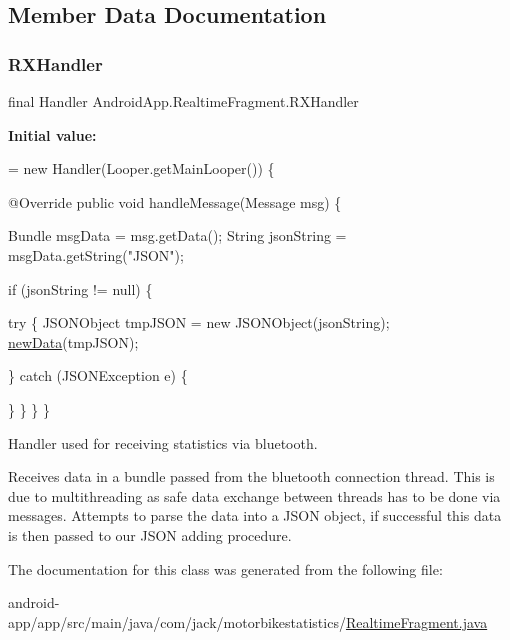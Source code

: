 \subsection{Member Data Documentation}
\mbox{\label{class_android_app_1_1_realtime_fragment_a6497ae268ff103aecc48a4bae15059d7}} 
\subsubsection{\texorpdfstring{R\+X\+Handler}{RXHandler}}
{\footnotesize\ttfamily final Handler Android\+App.\+Realtime\+Fragment.\+R\+X\+Handler}

{\bfseries Initial value\+:}
\begin{DoxyCode}
= \textcolor{keyword}{new} Handler(Looper.getMainLooper()) \{

        
        @Override
        \textcolor{keyword}{public} \textcolor{keywordtype}{void} handleMessage(Message msg) \{

            Bundle msgData = msg.getData();
            String jsonString = msgData.getString(\textcolor{stringliteral}{"JSON"});

            \textcolor{keywordflow}{if} (jsonString != null) \{

                
                \textcolor{keywordflow}{try} \{
                    JSONObject tmpJSON = \textcolor{keyword}{new} JSONObject(jsonString);
                    \hyperlink{class_android_app_1_1_realtime_fragment_a61735e07c8f7b382b176d7cd7443de3f}{newData}(tmpJSON);

                \} \textcolor{keywordflow}{catch} (JSONException e) \{
                    
                \}
            \}
        \}
    \}
\end{DoxyCode}


Handler used for receiving statistics via bluetooth. 

Receives data in a bundle passed from the bluetooth connection thread. This is due to multithreading as safe data exchange between threads has to be done via messages. Attempts to parse the data into a J\+S\+ON object, if successful this data is then passed to our J\+S\+ON adding procedure. 

The documentation for this class was generated from the following file\+:\begin{DoxyCompactItemize}
\item 
android-\/app/app/src/main/java/com/jack/motorbikestatistics/\hyperlink{_realtime_fragment_8java}{Realtime\+Fragment.\+java}\end{DoxyCompactItemize}
